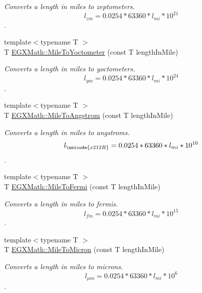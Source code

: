 \begin{DoxyCompactItemize}
\begin{DoxyCompactList}\small\item\em Converts a length in miles to zeptometers. \[ l_{zm}=0.0254 * 63360 * l_{mi} * 10^{21} \]. \end{DoxyCompactList}\item 
{\footnotesize template$<$typename T $>$ }\\T \mbox{\hyperlink{group___e_g_x_math-_conversions-_length_conversions-_imperial-_mile-_s_i_ga828eb49720729eca76e81999b0565959}{E\+G\+X\+Math\+::\+Mile\+To\+Yoctometer}} (const T length\+In\+Mile)
\begin{DoxyCompactList}\small\item\em Converts a length in miles to yoctometers. \[ l_{ym}=0.0254 * 63360 * l_{mi} * 10^{24} \]. \end{DoxyCompactList}\item 
{\footnotesize template$<$typename T $>$ }\\T \mbox{\hyperlink{group___e_g_x_math-_conversions-_length_conversions-_imperial-_mile-_non-_s_i_ga291d6035f59be619459011941676f7c7}{E\+G\+X\+Math\+::\+Mile\+To\+Angstrom}} (const T length\+In\+Mile)
\begin{DoxyCompactList}\small\item\em Converts a length in miles to angstroms. \[ l_{\unicode{x212B}}=0.0254 * 63360 * l_{mi} * 10^{10} \]. \end{DoxyCompactList}\item 
{\footnotesize template$<$typename T $>$ }\\T \mbox{\hyperlink{group___e_g_x_math-_conversions-_length_conversions-_imperial-_mile-_non-_s_i_gaf09d006cf827d210a8506e1add02cb0b}{E\+G\+X\+Math\+::\+Mile\+To\+Fermi}} (const T length\+In\+Mile)
\begin{DoxyCompactList}\small\item\em Converts a length in miles to fermis. \[ l_{fm}=0.0254 * 63360 * l_{mi} * 10^{15} \]. \end{DoxyCompactList}\item 
{\footnotesize template$<$typename T $>$ }\\T \mbox{\hyperlink{group___e_g_x_math-_conversions-_length_conversions-_imperial-_mile-_non-_s_i_ga0ab31c74561b6127ec6639c17c5c94e5}{E\+G\+X\+Math\+::\+Mile\+To\+Micron}} (const T length\+In\+Mile)
\begin{DoxyCompactList}\small\item\em Converts a length in miles to microns. \[ l_{\mu m}=0.0254 * 63360 * l_{mi} * 10^{6} \]. \end{DoxyCompactList}\item 

\end{DoxyCompactItemize}

